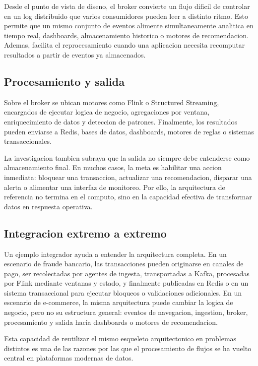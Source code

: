 \documentclass[12pt,a4paper]{article}
\begin{document}
Desde el punto de vista de diseno, el broker convierte un flujo dificil de controlar en un log distribuido que varios consumidores pueden leer a distinto ritmo. Esto permite que un mismo conjunto de eventos alimente simultaneamente analitica en tiempo real, dashboards, almacenamiento historico o motores de recomendacion. Ademas, facilita el reprocesamiento cuando una aplicacion necesita recomputar resultados a partir de eventos ya almacenados.

\subsection{Procesamiento y salida}

Sobre el broker se ubican motores como Flink o Structured Streaming, encargados de ejecutar logica de negocio, agregaciones por ventana, enriquecimiento de datos y deteccion de patrones. Finalmente, los resultados pueden enviarse a Redis, bases de datos, dashboards, motores de reglas o sistemas transaccionales.

La investigacion tambien subraya que la salida no siempre debe entenderse como almacenamiento final. En muchos casos, la meta es habilitar una accion inmediata: bloquear una transaccion, actualizar una recomendacion, disparar una alerta o alimentar una interfaz de monitoreo. Por ello, la arquitectura de referencia no termina en el computo, sino en la capacidad efectiva de transformar datos en respuesta operativa.

\subsection{Integracion extremo a extremo}

Un ejemplo integrador ayuda a entender la arquitectura completa. En un escenario de fraude bancario, las transacciones pueden originarse en canales de pago, ser recolectadas por agentes de ingesta, transportadas a Kafka, procesadas por Flink mediante ventanas y estado, y finalmente publicadas en Redis o en un sistema transaccional para ejecutar bloqueos o validaciones adicionales. En un escenario de e-commerce, la misma arquitectura puede cambiar la logica de negocio, pero no su estructura general: eventos de navegacion, ingestion, broker, procesamiento y salida hacia dashboards o motores de recomendacion.

Esta capacidad de reutilizar el mismo esqueleto arquitectonico en problemas distintos es una de las razones por las que el procesamiento de flujos se ha vuelto central en plataformas modernas de datos.
\end{document}
